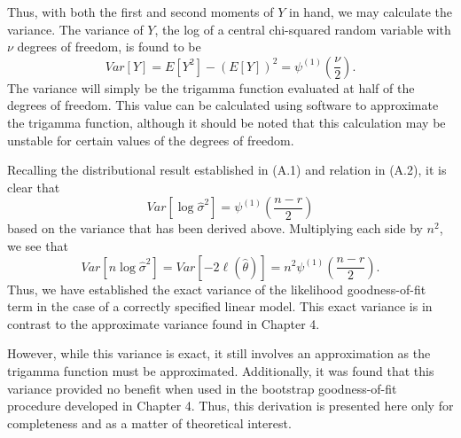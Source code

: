 Thus, with both the first and second moments of $Y$ in hand, we may calculate the variance. The variance of $Y$, the log of a central chi-squared random variable with
$\nu$ degrees of freedom, is found to be
\begin{equation*}
	Var \left[ Y \right ] = E \left[ Y^2 \right] - \left( E \left[ Y \right] \right)^2 = \psi^{(1)} \left( \frac{\nu}{2} \right) .
\end{equation*}
The variance will simply be the trigamma function evaluated at half of the degrees of freedom. This value can be calculated using software to approximate the trigamma function,
although it should be noted that this calculation may be unstable for certain values of the degrees of freedom.

Recalling the distributional result established in (A.1) and relation in (A.2), it is clear that
\begin{equation*}
	Var \left[ \log \hat{\sigma}^2 \right] = \psi^{(1)} \left( \frac{n-r}{2} \right)
\end{equation*}
based on the variance that has been derived above. Multiplying each side by $n^2$, we see that
\begin{equation*}
	Var \left[ n \log \hat{\sigma}^2 \right] = Var \left[ -2 \ell (\hat{\theta} ) \right] = n^2 \psi^{(1)} \left( \frac{n-r}{2} \right).
\end{equation*}
Thus, we have established the exact variance of the likelihood goodness-of-fit term in the case of a correctly specified linear model. This exact variance is in contrast to the
approximate variance found in Chapter 4.

However, while this variance is exact, it still involves an approximation as the trigamma function must be approximated. Additionally, it was found that
this variance provided no benefit when used in the bootstrap goodness-of-fit procedure developed in Chapter 4. Thus, this derivation is presented here only
for completeness and as a matter of theoretical interest.










